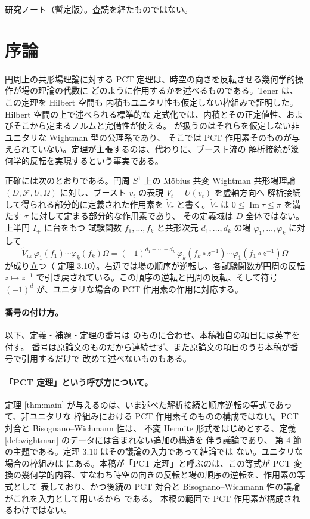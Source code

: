 \documentclass[11pt,a4paper]{article}
\newcommand{\Circ}{S^{1}}
\newcommand{\Fields}{\mathcal{F}}
\newcommand{\Vt}{\widetilde{V}}
\newcommand{\Dom}{D}
\theoremstyle{definition}
\begin{document}
\medskip
\begin{center}
{\sffamily\small 研究ノート（暫定版）。査読を経たものではない。}
\end{center}

\tableofcontents

\section{序論}

円周上の共形場理論に対する PCT 定理は、時空の向きを反転させる幾何学的操作が場の理論の代数に
どのように作用するかを述べるものである。Tener \cite{T26} は、この定理を Hilbert 空間も
内積もユニタリ性も仮定しない枠組みで証明した。Hilbert 空間の上で述べられる標準的な
定式化では、内積とその正定値性、およびそこから定まるノルムと完備性が使える。
\cite{T26} が扱うのはそれらを仮定しない非ユニタリな Wightman 型の公理系であり、
そこでは PCT 作用素そのものが与えられていない。定理が主張するのは、代わりに、ブースト流の
解析接続が幾何学的反転を実現するという事実である。

正確には次のとおりである。円周 $\Circ$ 上の M\"obius 共変 Wightman 共形場理論
$(\Dom, \Fields, U, \Omega)$ に対し、ブースト $v_t$ の表現 $V_t = U(v_t)$ を虚軸方向へ
解析接続して得られる部分的に定義された作用素を $\Vt_\tau$ と書く。$\Vt_\tau$ は
$0 \le \operatorname{Im}\tau \le \pi$ を満たす $\tau$ に対して定まる部分的な作用素であり、
その定義域は $\Dom$ 全体ではない。上半円 $I_+$ に台をもつ
試験関数 $f_1, \dots, f_k$ と共形次元 $d_1, \dots, d_k$ の場 $\varphi_1, \dots, \varphi_k$
に対して
\[
  \Vt_{i\pi}\, \varphi_1(f_1)\cdots\varphi_k(f_k)\Omega
  = (-1)^{d_1+\cdots+d_k}\, \varphi_k(f_k \circ z^{-1})\cdots\varphi_1(f_1 \circ z^{-1})\Omega
\]
が成り立つ（\cite{T26} 定理 3.10）。右辺では場の順序が逆転し、各試験関数が円周の反転
$z \mapsto z^{-1}$ で引き戻されている。この順序の逆転と円周の反転、そして符号 $(-1)^d$ が、ユニタリな場合の
PCT 作用素の作用に対応する。

\paragraph{番号の付け方。}
以下、定義・補題・定理の番号は \cite{T26} のものに合わせ、本稿独自の項目には英字を付す。
番号は原論文のものだから連続せず、また原論文の項目のうち本稿が番号で引用するだけで
改めて述べないものもある。

\paragraph{「PCT 定理」という呼び方について。}
定理 \ref{thm:main} が与えるのは、いま述べた解析接続と順序逆転の等式であって、非ユニタリな
枠組みにおける PCT 作用素そのものの構成ではない。PCT 対合と Bisognano--Wichmann 性は、
不変 Hermite 形式をはじめとする、定義 \ref{def:wightman} のデータには含まれない追加の構造を
伴う議論であり、\cite{T26} 第 4 節の主題である。定理 3.10 はその議論の入力であって結論では
ない。ユニタリな場合の枠組みは \cite{RTT22} にある。本稿が「PCT 定理」と呼ぶのは、この等式が
PCT 変換の幾何学的内容、すなわち時空の向きの反転と場の順序の逆転を、作用素の等式として
表しており、かつ後続の PCT 対合と Bisognano--Wichmann 性の議論がこれを入力として用いるから
である。
本稿の範囲で PCT 作用素が構成されるわけではない。
\end{document}
